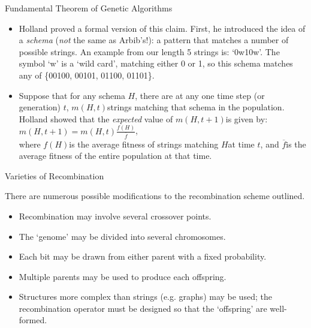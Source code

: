 \documentclass{article}
\begin{document}
\begin{slide}{}
{\Large Fundamental Theorem of Genetic Algorithms}
\begin{itemize}
\item Holland proved a formal version of this claim. First, he introduced
the idea of a {\em schema} ({\em not} the same as Arbib's!): a pattern
that matches a number of
possible strings. An example from our length 5 strings is: `0w10w'. The
symbol `w' is a `wild card', matching either 0 or 1, so this schema
matches any of \{00100, 00101, 01100, 01101\}.
\item Suppose that for any schema $H$, there are at any one time step (or
generation) $t$,
$m(H,t)$\space strings matching that schema in the population. Holland
showed that the {\em expected} value of $m(H,t+1)$\space is given by:\\\hspace*{.5cm}$m(H,t+1)=m(H,t)\frac{f(H)}{\overline f}$,\\where $f(H)$\space is the average fitness of strings matching $H$\space at time
$t$, and $\overline f$\space is the average fitness of the entire
population at that time.
\end{itemize}
\end{slide}

\begin{slide}{}
{\Large Varieties of Recombination}

There are numerous possible modifications to the recombination scheme outlined.
\begin{itemize}
\item Recombination may involve several crossover points.
\item The `genome' may be divided into several chromosomes.
\item Each bit may be drawn from either parent with a fixed
probability.
\item Multiple parents may be used to produce each offspring.
\item Structures more complex than strings (e.g. graphs) may be
used; the recombination operator must be designed so
that the `offspring' are well-formed.
\end{itemize}
\end{slide}
\end{document}
